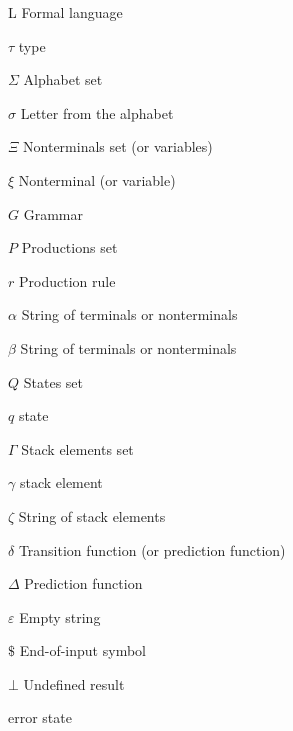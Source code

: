 \begin{abbrv}
\item[L] Formal language
\item[$τ$] \Java type
\item[$Σ$] Alphabet set
\item[$σ$] Letter from the alphabet
\item[$Ξ$] Nonterminals set (or variables)
\item[$ξ$] Nonterminal (or variable)
\item[$G$] Grammar
\item[$P$] Productions set
\item[$r$] Production rule
\item[$α$] String of terminals or nonterminals
\item[$β$] String of terminals or nonterminals
\item[$Q$] States set
\item[$q$] state
\item[$Γ$] Stack elements set
\item[$γ$] stack element
\item[$ζ$] String of stack elements
\item[$δ$] Transition function (or prediction function)
\item[$Δ$] Prediction function
\item[$ε$] Empty string
\item[$\$$] End-of-input symbol
\item[$\bot$] Undefined result

\item[\currency] error state
\end{abbrv}
